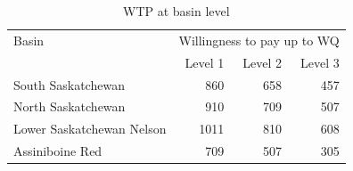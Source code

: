 \begin{table}[ht]
\centering
\caption{WTP at basin level} 
\begin{tabular}{lrrr}
  \hline
Basin & \multicolumn{3}{c}{Willingness to pay up to WQ }\\ 
 & Level 1 & Level 2 & Level 3 \\ 
  \hline
South Saskatchewan & 860 & 658 & 457 \\ 
North Saskatchewan & 910 & 709 & 507 \\ 
Lower Saskatchewan Nelson  & 1011 & 810 & 608 \\ 
Assiniboine Red & 709 & 507 & 305 \\ 
   \hline
\end{tabular}
\end{table}
